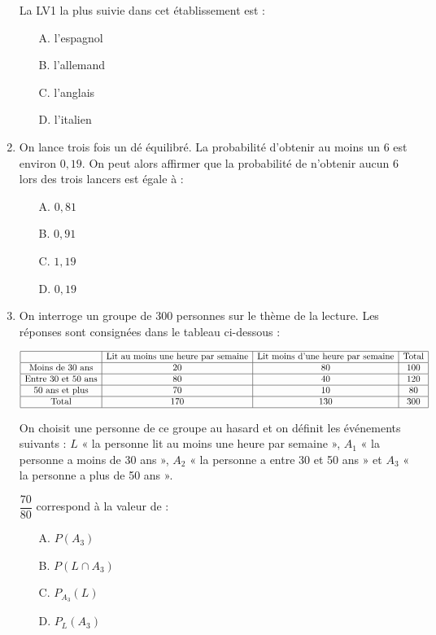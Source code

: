 \documentclass[a4paper,12pt]{article}
\begin{document}
\begin{enumerate}
La LV1 la plus suivie dans cet établissement est :
\begin{itemize}
\item[A.] l'espagnol
\item[B.] l'allemand
\item[C.] l'anglais
\item[D.] l'italien
\end{itemize}

\item On lance trois fois un dé équilibré. La probabilité d'obtenir au moins un 6 est environ $0,19$. On peut alors affirmer que la probabilité de n'obtenir aucun 6 lors des trois lancers est égale à :
\begin{itemize}
\item[A.] $0,81$
\item[B.] $0,91$
\item[C.] $1,19$
\item[D.] $0,19$
\end{itemize}

\item On interroge un groupe de 300 personnes sur le thème de la lecture. Les réponses sont consignées dans le tableau ci-dessous :

\[
\begin{array}{|c|c|c|c|}
\hline
& \text{Lit au moins une heure par semaine} & \text{Lit moins d'une heure par semaine} & \text{Total} \\
\hline
\text{Moins de 30 ans} & 20 & 80 & 100 \\
\hline
\text{Entre 30 et 50 ans} & 80 & 40 & 120 \\
\hline
\text{50 ans et plus} & 70 & 10 & 80 \\
\hline
\text{Total} & 170 & 130 & 300 \\
\hline
\end{array}
\]

On choisit une personne de ce groupe au hasard et on définit les événements suivants : $L$ « la personne lit au moins une heure par semaine », $A_1$ « la personne a moins de 30 ans », $A_2$ « la personne a entre 30 et 50 ans » et $A_3$ « la personne a plus de 50 ans ».

$\dfrac{70}{80}$ correspond à la valeur de :
\begin{itemize}
\item[A.] $P(A_3)$
\item[B.] $P(L \cap A_3)$
\item[C.] $P_{A_3}(L)$
\item[D.] $P_L(A_3)$
\end{itemize}


\end{enumerate}
\end{document}
